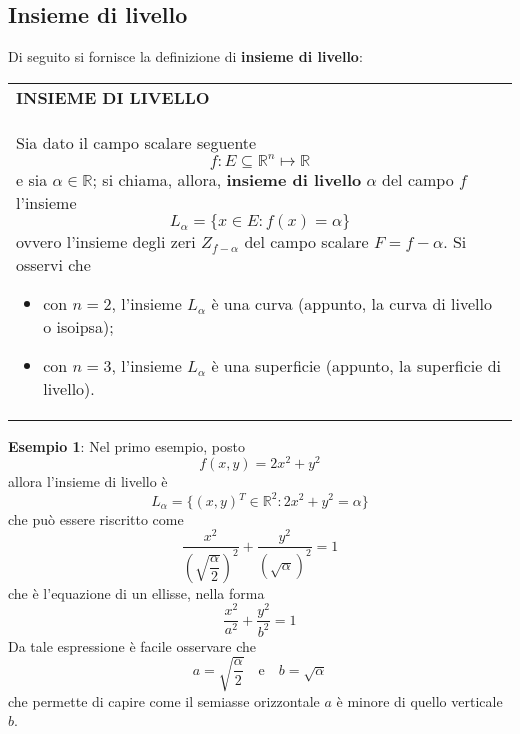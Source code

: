 \documentclass[a4paper]{extarticle}
\renewcommand\arraystretch{}
\begin{document}
\vspace{1em}
\noindent
\subsection{Insieme di livello}
Di seguito si fornisce la definizione di \textbf{insieme di livello}:

\vspace{1em}
\setlength{\tabcolsep}{14pt}
\renewcommand{\arraystretch}{2}
\noindent
\begin{tabularx}{\textwidth}{@{}|P|@{}}
    \hline
    {\textbf{INSIEME DI LIVELLO}}\\
    \parbox{\linewidth}{Sia dato il campo scalare seguente
    \[f : E \subseteq \mathbb{R}^n \longmapsto \mathbb{R}\]
    e sia $\alpha \in \mathbb{R}$; si chiama, allora, \textbf{insieme di livello} $\alpha$ del campo $f$ l'insieme
    \[L_\alpha = \{x \in E : f(x)=\alpha\}\]
    ovvero l'insieme degli zeri $Z_{f-\alpha}$ del campo scalare $F=f-\alpha$. Si osservi che
    \begin{itemize}
        \item con $n=2$, l'insieme $L_\alpha$ è una curva (appunto, la curva di livello o isoipsa);
        \item con $n=3$, l'insieme $L_\alpha$ è una superficie (appunto, la superficie di livello).
    \end{itemize}
    \vspace{1mm}}\\
    \hline
\end{tabularx}

\vspace{2em}
\noindent
\textbf{Esempio 1}: Nel primo esempio, posto
\[f(x,y)=2x^2+y^2\]
allora l'insieme di livello è
\[L_\alpha = \{(x,y){^T} \in \mathbb{R}^2 : 2x^2+y^2=\alpha\}\]
che può essere riscritto come
\[\frac{x^2}{\left(\sqrt{\dfrac{\alpha}{2}} \right)^2} + \frac{y^2}{(\sqrt{\alpha})^2}=1\]
che è l'equazione di un ellisse, nella forma
\[\dfrac{x^2}{a^2}+\dfrac{y^2}{b^2}=1\]
Da tale espressione è facile osservare che
\[a=\sqrt{\frac{\alpha}{2}} \hspace{1em} \text{e} \hspace{1em} b=\sqrt{\alpha}\]
che permette di capire come il semiasse orizzontale $a$ è minore di quello verticale $b$.
\end{document}
